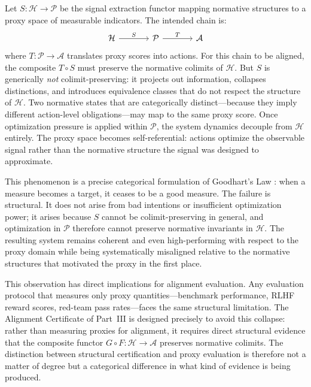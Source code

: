 \documentclass[12pt]{article}
\theoremstyle{definition}
\begin{document}
Let $S : \mathcal{H} \to \mathcal{P}$ be the signal extraction functor mapping
normative structures to a proxy space of measurable indicators. The intended
chain is:
\begin{equation}
\begin{tikzcd}[column sep=large]
\mathcal{H}
  \arrow[r, "S"]
& \mathcal{P}
  \arrow[r, "T"]
& \mathcal{A}
\end{tikzcd}
\end{equation}
where $T : \mathcal{P} \to \mathcal{A}$ translates proxy scores into actions.
For this chain to be aligned, the composite $T \circ S$ must preserve the
normative colimits of $\mathcal{H}$. But $S$ is generically \emph{not}
colimit-preserving: it projects out information, collapses distinctions, and
introduces equivalence classes that do not respect the structure of $\mathcal{H}$.
Two normative states that are categorically distinct---because they imply
different action-level obligations---may map to the same proxy score. Once
optimization pressure is applied within $\mathcal{P}$, the system dynamics
decouple from $\mathcal{H}$ entirely. The proxy space becomes self-referential:
actions optimize the observable signal rather than the normative structure the
signal was designed to approximate.

This phenomenon is a precise categorical formulation of Goodhart's Law
\citep{manheim2018categorizing}: when a measure becomes a target, it ceases to
be a good measure. The failure is structural. It does not arise from bad
intentions or insufficient optimization power; it arises because $S$ cannot
be colimit-preserving in general, and optimization in $\mathcal{P}$ therefore
cannot preserve normative invariants in $\mathcal{H}$. The resulting system
remains coherent and even high-performing with respect to the proxy domain
while being systematically misaligned relative to the normative structures that
motivated the proxy in the first place.

This observation has direct implications for alignment evaluation. Any
evaluation protocol that measures only proxy quantities---benchmark performance,
RLHF reward scores, red-team pass rates---faces the same structural limitation.
The Alignment Certificate of Part~III is designed precisely to avoid this
collapse: rather than measuring proxies for alignment, it requires direct
structural evidence that the composite functor $G \circ F : \mathcal{H} \to
\mathcal{A}$ preserves normative colimits. The distinction between structural
certification and proxy evaluation is therefore not a matter of degree but a
categorical difference in what kind of evidence is being produced.
\end{document}

